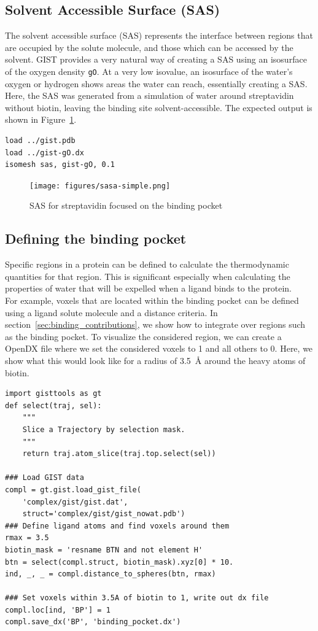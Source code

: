 \documentclass[9pt,tutorial]{livecoms}
\newcommand{\code}{\texttt}
\begin{document}
\subsection{Solvent Accessible Surface (SAS)}
The solvent accessible surface (SAS) represents the interface between regions that are occupied by the solute molecule, and those which can be accessed by the solvent.
GIST provides a very natural way of creating a SAS using an isosurface of the oxygen density \code{gO}.
At a very low isovalue, an isosurface of the water's oxygen or hydrogen shows areas the water can reach, essentially creating a SAS. 
Here, the SAS was generated from a simulation of water around streptavidin without biotin, leaving the binding site solvent-accessible.
The expected output is shown in Figure~\ref{fig-streptavidin_sasa}.

\begin{lstlisting}[style=pymol]
load ../gist.pdb
load ../gist-gO.dx
isomesh sas, gist-gO, 0.1
\end{lstlisting}

\begin{figure}
	\centering
	\texttt{[image: figures/sasa-simple.png]}
	\caption{SAS for streptavidin focused on the binding pocket}\label{fig-streptavidin_sasa}
\end{figure}
\subsection{Defining the binding pocket}
Specific regions in a protein can be defined to calculate the thermodynamic quantities for that region.
This is significant especially when calculating the properties of water that will be expelled when a ligand binds to the protein.\\
For example, voxels that are located within the binding pocket can be defined using a ligand solute molecule and a distance criteria. 
In section~\ref{sec:binding_contributions}, we show how to integrate over regions such as the binding pocket. 
To visualize the considered region, we can create a OpenDX file where we set the considered voxels to 1 and all others to 0. Here, we show what this would look like for a radius of \qty{3.5}{\angstrom} around the heavy atoms of biotin. 

\begin{lstlisting}[style=python]
import gisttools as gt
def select(traj, sel):
	""" 
	Slice a Trajectory by selection mask. 
	"""
	return traj.atom_slice(traj.top.select(sel))

### Load GIST data
compl = gt.gist.load_gist_file(
	'complex/gist/gist.dat', 
	struct='complex/gist/gist_nowat.pdb')
### Define ligand atoms and find voxels around them
rmax = 3.5
biotin_mask = 'resname BTN and not element H'
btn = select(compl.struct, biotin_mask).xyz[0] * 10.
ind, _, _ = compl.distance_to_spheres(btn, rmax)

### Set voxels within 3.5A of biotin to 1, write out dx file
compl.loc[ind, 'BP'] = 1
compl.save_dx('BP', 'binding_pocket.dx')
\end{lstlisting}
\end{document}

